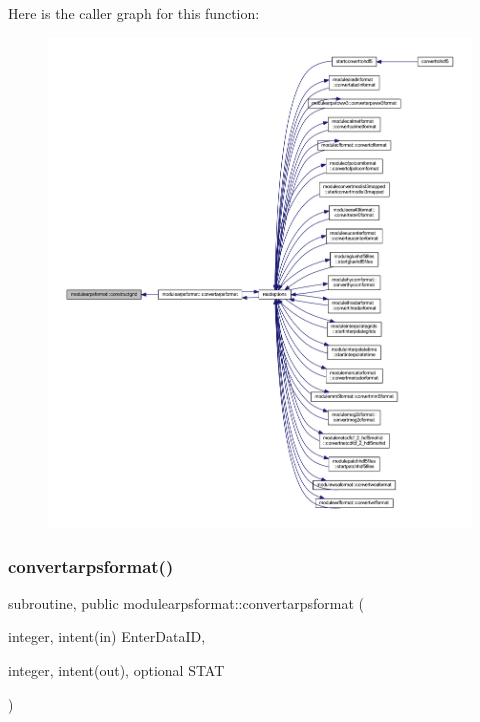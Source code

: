 Here is the caller graph for this function\+:\nopagebreak
\begin{figure}[H]
\begin{center}
\leavevmode
\includegraphics[width=350pt]{namespacemodulearpsformat_a420eb740016c6ba55f897dbff1ef74e5_icgraph}
\end{center}
\end{figure}
\mbox{\label{namespacemodulearpsformat_a996acecfde01fb49e6408da52cb50d12}} 
\subsubsection{\texorpdfstring{convertarpsformat()}{convertarpsformat()}}
{\footnotesize\ttfamily subroutine, public modulearpsformat\+::convertarpsformat (\begin{DoxyParamCaption}\item[{integer, intent(in)}]{Enter\+Data\+ID,  }\item[{integer, intent(out), optional}]{S\+T\+AT }\end{DoxyParamCaption})}

